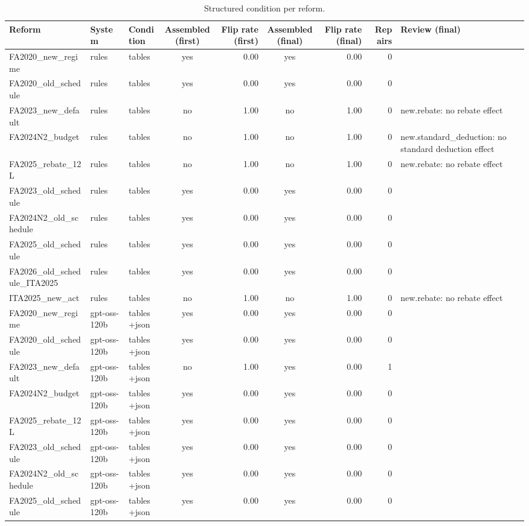 \begin{table}[t]
\centering\small
\caption{Structured condition per reform.}
\label{tab:structured_detail}
\begin{tabular}{lllcrcrrl}
\toprule
Reform & System & Condition & Assembled (first) & Flip rate (first) & Assembled (final) & Flip rate (final) & Repairs & Review (final) \\
\midrule
FA2020\_new\_regime & rules & tables & yes & 0.00 & yes & 0.00 & 0 &  \\
FA2020\_old\_schedule & rules & tables & yes & 0.00 & yes & 0.00 & 0 &  \\
FA2023\_new\_default & rules & tables & no & 1.00 & no & 1.00 & 0 & new.rebate: no rebate effect \\
FA2024N2\_budget & rules & tables & no & 1.00 & no & 1.00 & 0 & new.standard\_deduction: no standard deduction effect \\
FA2025\_rebate\_12L & rules & tables & no & 1.00 & no & 1.00 & 0 & new.rebate: no rebate effect \\
FA2023\_old\_schedule & rules & tables & yes & 0.00 & yes & 0.00 & 0 &  \\
FA2024N2\_old\_schedule & rules & tables & yes & 0.00 & yes & 0.00 & 0 &  \\
FA2025\_old\_schedule & rules & tables & yes & 0.00 & yes & 0.00 & 0 &  \\
FA2026\_old\_schedule\_ITA2025 & rules & tables & yes & 0.00 & yes & 0.00 & 0 &  \\
ITA2025\_new\_act & rules & tables & no & 1.00 & no & 1.00 & 0 & new.rebate: no rebate effect \\
FA2020\_new\_regime & gpt-oss-120b & tables+json & yes & 0.00 & yes & 0.00 & 0 &  \\
FA2020\_old\_schedule & gpt-oss-120b & tables+json & yes & 0.00 & yes & 0.00 & 0 &  \\
FA2023\_new\_default & gpt-oss-120b & tables+json & no & 1.00 & yes & 0.00 & 1 &  \\
FA2024N2\_budget & gpt-oss-120b & tables+json & yes & 0.00 & yes & 0.00 & 0 &  \\
FA2025\_rebate\_12L & gpt-oss-120b & tables+json & yes & 0.00 & yes & 0.00 & 0 &  \\
FA2023\_old\_schedule & gpt-oss-120b & tables+json & yes & 0.00 & yes & 0.00 & 0 &  \\
FA2024N2\_old\_schedule & gpt-oss-120b & tables+json & yes & 0.00 & yes & 0.00 & 0 &  \\
FA2025\_old\_schedule & gpt-oss-120b & tables+json & yes & 0.00 & yes & 0.00 & 0 &  \\

\end{tabular}
\end{table}
